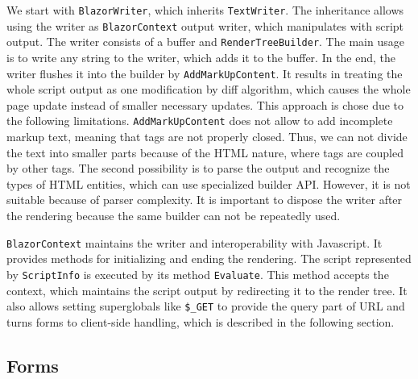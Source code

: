 We start with \texttt{BlazorWriter}, which inherits \texttt{TextWriter}.
The inheritance allows using the writer as \texttt{BlazorContext} output writer, which manipulates with script output.
The writer consists of a buffer and \texttt{RenderTreeBuilder}.
The main usage is to write any string to the writer, which adds it to the buffer.
In the end, the writer flushes it into the builder by \texttt{AddMarkUpContent}.
It results in treating the whole script output as one modification by diff algorithm, which causes the whole page update instead of smaller necessary updates.
This approach is chose due to the following limitations.
\texttt{AddMarkUpContent} does not allow to add incomplete markup text, meaning that tags are not properly closed.
Thus, we can not divide the text into smaller parts because of the HTML nature, where tags are coupled by other tags.
The second possibility is to parse the output and recognize the types of HTML entities, which can use specialized builder API.
However, it is not suitable because of parser complexity.
It is important to dispose the writer after the rendering because the same builder can not be repeatedly used.
\par
\texttt{BlazorContext} maintains the writer and interoperability with Javascript.
It provides methods for initializing and ending the rendering.
The script represented by \texttt{ScriptInfo} is executed by its method \texttt{Evaluate}. This method accepts the context, which maintains the script output by redirecting it to the render tree.
It also allows setting superglobals like \texttt{\$\_GET} to provide the query part of URL and turns forms to client-side 
handling, which is described in the following section.

\subsection{Forms}

